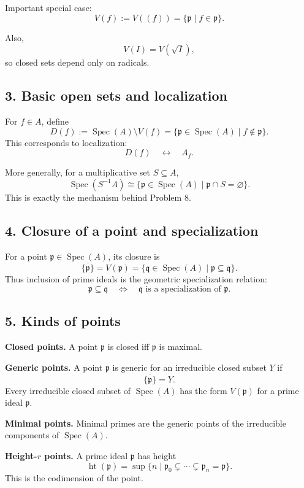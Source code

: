 \documentclass[12pt,a4paper]{article}
\theoremstyle{plain}
\theoremstyle{definition}      %
\begin{document}
Important special case:
\[
V(f):=V((f))=\{\mathfrak p\mid f\in \mathfrak p\}.
\]

Also,
\[
V(I)=V(\sqrt I),
\]
so closed sets depend only on radicals.

\subsection*{3. Basic open sets and localization}

For \(f\in A\), define
\[
D(f):=\operatorname{Spec}(A)\setminus V(f)
=\{\mathfrak p\in\operatorname{Spec}(A)\mid f\notin\mathfrak p\}.
\]
This corresponds to localization:
\[
D(f)\quad \leftrightarrow \quad A_f.
\]

More generally, for a multiplicative set \(S\subseteq A\),
\[
\operatorname{Spec}(S^{-1}A)
\cong
\{\mathfrak p\in\operatorname{Spec}(A)\mid \mathfrak p\cap S=\varnothing\}.
\]
This is exactly the mechanism behind Problem 8.

\subsection*{4. Closure of a point and specialization}

For a point \(\mathfrak p\in\operatorname{Spec}(A)\), its closure is
\[
\overline{\{\mathfrak p\}}=V(\mathfrak p)
=\{\mathfrak q\in\operatorname{Spec}(A)\mid \mathfrak p\subseteq \mathfrak q\}.
\]
Thus inclusion of prime ideals is the geometric specialization relation:
\[
\mathfrak p\subseteq \mathfrak q
\quad \Longleftrightarrow \quad
\mathfrak q \text{ is a specialization of } \mathfrak p.
\]

\subsection*{5. Kinds of points}

\textbf{Closed points.}
A point \(\mathfrak p\) is closed iff \(\mathfrak p\) is maximal.

\textbf{Generic points.}
A point \(\mathfrak p\) is generic for an irreducible closed subset \(Y\) if
\[
\overline{\{\mathfrak p\}}=Y.
\]
Every irreducible closed subset of \(\operatorname{Spec}(A)\) has the form \(V(\mathfrak p)\) for a prime ideal \(\mathfrak p\).

\textbf{Minimal points.}
Minimal primes are the generic points of the irreducible components of \(\operatorname{Spec}(A)\).

\textbf{Height-\(r\) points.}
A prime ideal \(\mathfrak p\) has height
\[
\operatorname{ht}(\mathfrak p)=
\sup\{n\mid \mathfrak p_0\subsetneq\cdots\subsetneq \mathfrak p_n=\mathfrak p\}.
\]
This is the codimension of the point.
\end{document}
